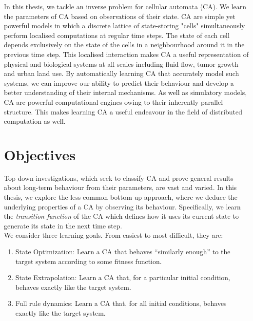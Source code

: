 In this thesis, we tackle an inverse problem for cellular automata (CA). We learn the parameters of CA based on observations of their state. CA are simple yet powerful models in which a discrete lattice of state-storing "cells" simultaneously perform localised computations at regular time steps. The state of each cell depends exclusively on the state of the cells in a neighbourhood around it in the previous time step. This localised interaction makes CA a useful representation of physical and biological systems at all scales including fluid flow\cite{wolf2004lattice}, tumor growth\cite{deutsch2021bio, reher2017cell} and urban land use\cite{white2000high}. By automatically learning CA that accurately model such systems, we can improve our ability to predict their behaviour and develop a better understanding of their internal mechanisms. As well as simulatory models, CA are powerful computational engines owing to their inherently parallel structure. This makes learning CA a useful endeavour in the field of distributed computation as well\cite{tosic2005cellular}.\\


\section{Objectives}

Top-down investigations, which seek to classify CA and prove general results about long-term behaviour from their parameters, are vast and varied\cite{packard1985two, wolfram2002,eppstein2010growth}. In this thesis, we explore the less common bottom-up approach, where we deduce the underlying properties of a CA by observing its behaviour. Specifically, we learn the \textit{transition function} of the CA which defines how it uses its current state to generate its state in the next time step.\\

We consider three learning goals. From easiest to most difficult, they are:
\begin{enumerate}
    \item State Optimization: Learn a CA that behaves ``similarly enough'' to the target system according to some fitness function. 
    \item State Extrapolation: Learn a CA that, for a particular initial condition, behaves exactly like the target system.
    \item Full rule dynamics: Learn a CA that, for all initial conditions, behaves exactly like the target system.
\end{enumerate}


